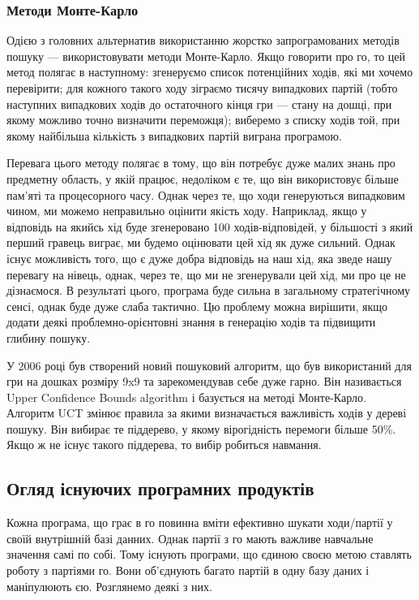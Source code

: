 \subsubsection{Методи Монте-Карло}
Одією з головних альтернатив використанню жорстко запрограмованих методів пошуку --- використовувати методи Монте-Карло. Якщо говорити про го, то цей метод полягає в наступному:  згенеруємо список потенційних ходів, які ми хочемо перевірити; для кожного такого ходу зіграємо тисячу випадкових партій (тобто наступних випадкових ходів до остаточного кінця гри --- стану на дошці, при якому можливо точно визначити переможця); виберемо з списку ходів той, при якому найбільша кількість з випадкових партій виграна програмою.

Перевага цього методу полягає в тому, що він потребує дуже малих знань про предметну область, у якій працює, недоліком є те, що він використовує більше пам'яті та процесорного часу. Однак через те, що ходи генеруються випадковим чином, ми можемо неправильно оцінити якість ходу. Наприклад, якщо у відповідь на якийсь хід буде згенеровано 100 ходів-відповідей, у більшості з який перший гравець виграє, ми будемо оцінювати цей хід як дуже сильний. Однак існує можливість того, що є дуже добра відповідь на наш хід, яка зведе нашу перевагу на нівець, однак, через те, що ми не згенерували цей хід, ми про це не дізнаємося. В результаті цього, програма буде сильна в загальному стратегічному сенсі, однак буде дуже слаба тактично. Цю проблему можна вирішити, якщо додати деякі проблемно-орієнтовні знання в генерацію ходів та підвищити глибину пошуку.

У 2006 році був створений новий пошуковий алгоритм, що був використаний для гри на дошках розміру 9x9 та зарекомендував себе дуже гарно. Він називається Upper Confidence Bounds algorithm і базується на методі Монте-Карло. Алгоритм UCT змінює правила за якими визначається важливість ходів у дереві пошуку. Він вибирає те піддерево, у якому вірогідність перемоги більше 50\%. Якщо ж не існує такого піддерева, то вибір робиться навмання.
\subsection{Огляд існуючих програмних продуктів}
Кожна програма, що грає в го повинна вміти ефективно шукати ходи/партії у своїй внутрішній базі данних. Однак партії з го мають важливе навчальне значення самі по собі. Тому існують програми, що єдиною своєю метою ставлять роботу з партіями го. Вони об'єднують багато партій в одну базу даних і маніпулюють єю. Розглянемо деякі з них.

